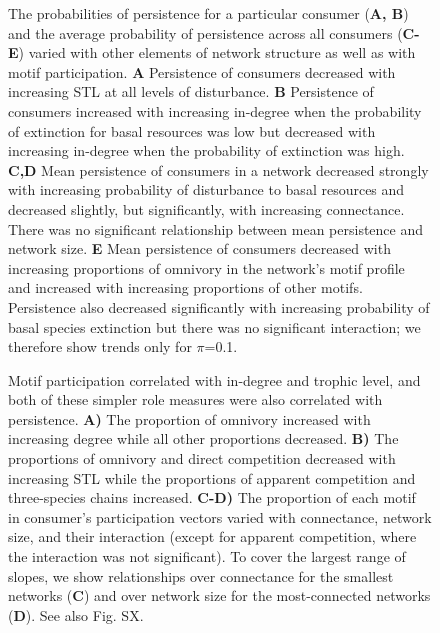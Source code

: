 \documentclass[12pt]{article}
\begin{document}
\begin{spacing}{2.0}
    \begin{figure}[ht!]
        \centering
        \caption{The probabilities of persistence for a particular consumer (\textbf{A, B}) and the average probability of persistence across all consumers (\textbf{C-E}) varied with other elements of network structure as well as with motif participation.
        \textbf{A} Persistence of consumers decreased with increasing STL at all levels of disturbance.
        \textbf{B} Persistence of consumers increased with increasing in-degree when the probability of extinction for basal resources was low but decreased with increasing in-degree when the probability of extinction was high.
        \textbf{C,D} Mean persistence of consumers in a network decreased strongly with increasing probability of disturbance to basal resources and decreased slightly, but significantly, with increasing connectance. There was no significant relationship between mean persistence and network size.
        \textbf{E} Mean persistence of consumers decreased with increasing proportions of omnivory in the network's motif profile and increased with increasing proportions of other motifs. Persistence also decreased significantly with increasing probability of basal species extinction but there was no significant interaction; we therefore show trends only for $\pi$=0.1.}
        \label{fig:lm_CS}
    \end{figure}

    \begin{figure}[hb!]
        \centering
        \caption{Motif participation correlated with in-degree and trophic level, and both of these simpler role measures were also correlated with persistence. \textbf{A)} The proportion of omnivory increased with increasing degree while all other proportions decreased. \textbf{B)} The proportions of omnivory and direct competition decreased with increasing STL while the proportions of apparent competition and three-species chains increased. \textbf{C-D)} The proportion of each motif in consumer's participation vectors varied with connectance, network size, and their interaction (except for apparent competition, where the interaction was not significant). To cover the largest range of slopes, we show relationships over connectance for the smallest networks (\textbf{C}) and over network size for the most-connected networks (\textbf{D}). See also Fig. SX. }
        \label{fig:motifs_vs_TL_and_deg}
    \end{figure}        




\end{spacing}
\end{document}
